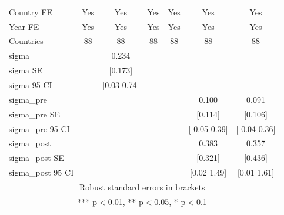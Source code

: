 \begin{tabular}{lcccccc}
Country FE & Yes & Yes & Yes & Yes & Yes & Yes \\
Year FE & Yes & Yes & Yes & Yes & Yes & Yes \\
Countries & 88 & 88 & 88 & 88 & 88 & 88 \\
sigma &  & 0.234 &  &  &  &  \\
sigma SE &  & [0.173] &  &  &  &  \\
sigma 95 CI &  & [0.03 0.74] &  &  &  &  \\
sigma\_pre &  &  &  &  & 0.100 & 0.091 \\
sigma\_pre SE &  &  &  &  & [0.114] & [0.106] \\
sigma\_pre 95 CI &  &  &  &  & [-0.05 0.39] & [-0.04 0.36] \\
sigma\_post &  &  &  &  & 0.383 & 0.357 \\
sigma\_post SE &  &  &  &  & [0.321] & [0.436] \\
 sigma\_post 95 CI &  &  &  &  & [0.02 1.49] & [0.01 1.61] \\ \hline
\multicolumn{7}{c}{ Robust standard errors in brackets} \\
\multicolumn{7}{c}{ *** p$<$0.01, ** p$<$0.05, * p$<$0.1} \\
\end{tabular}
